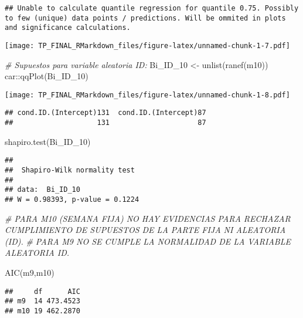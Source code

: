 \documentclass[
]{article}
\newenvironment{Shaded}{\begin{snugshade}}{\end{snugshade}}
\newcommand{\CommentTok}[1]{\textcolor[rgb]{0.56,0.35,0.01}{\textit{#1}}}
\newcommand{\FunctionTok}[1]{\textcolor[rgb]{0.00,0.00,0.00}{#1}}
\newcommand{\NormalTok}[1]{#1}
\newcommand{\OtherTok}[1]{\textcolor[rgb]{0.56,0.35,0.01}{#1}}
\newcommand{\SpecialCharTok}[1]{\textcolor[rgb]{0.00,0.00,0.00}{#1}}
\begin{document}
\begin{verbatim}
## Unable to calculate quantile regression for quantile 0.75. Possibly to few (unique) data points / predictions. Will be ommited in plots and significance calculations.
\end{verbatim}

\texttt{[image: TP\_FINAL\_RMarkdown\_files/figure-latex/unnamed-chunk-1-7.pdf]}

\begin{Shaded}
\begin{Highlighting}[]
\CommentTok{\# Supuestos para variable aleatoria ID:}
\NormalTok{Bi\_ID\_10 }\OtherTok{\textless{}{-}} \FunctionTok{unlist}\NormalTok{(}\FunctionTok{ranef}\NormalTok{(m10))}
\NormalTok{car}\SpecialCharTok{::}\FunctionTok{qqPlot}\NormalTok{(Bi\_ID\_10)}
\end{Highlighting}
\end{Shaded}

\texttt{[image: TP\_FINAL\_RMarkdown\_files/figure-latex/unnamed-chunk-1-8.pdf]}

\begin{verbatim}
## cond.ID.(Intercept)131  cond.ID.(Intercept)87 
##                    131                     87
\end{verbatim}

\begin{Shaded}
\begin{Highlighting}[]
\FunctionTok{shapiro.test}\NormalTok{(Bi\_ID\_10)}
\end{Highlighting}
\end{Shaded}

\begin{verbatim}
## 
##  Shapiro-Wilk normality test
## 
## data:  Bi_ID_10
## W = 0.98393, p-value = 0.1224
\end{verbatim}

\begin{Shaded}
\begin{Highlighting}[]
\CommentTok{\# PARA M10 (SEMANA FIJA) NO HAY EVIDENCIAS PARA RECHAZAR CUMPLIMIENTO DE SUPUESTOS DE LA PARTE FIJA NI ALEATORIA (ID).}
\CommentTok{\# PARA M9 NO SE CUMPLE LA NORMALIDAD DE LA VARIABLE ALEATORIA ID.}

\FunctionTok{AIC}\NormalTok{(m9,m10)}
\end{Highlighting}
\end{Shaded}

\begin{verbatim}
##     df      AIC
## m9  14 473.4523
## m10 19 462.2870
\end{verbatim}
\end{document}
